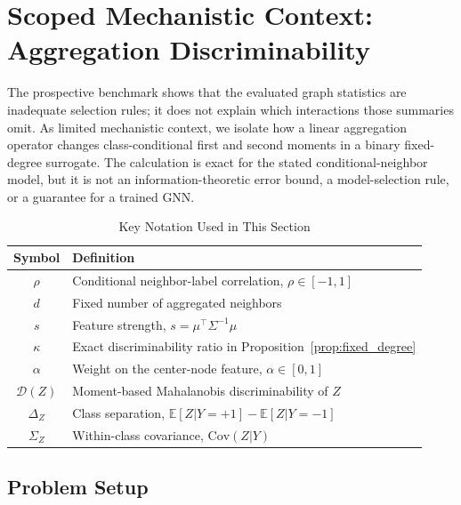 
\section{Scoped Mechanistic Context: Aggregation Discriminability}
\label{sec:snr}

The prospective benchmark shows that the evaluated graph statistics are inadequate selection rules; it does not explain which interactions those summaries omit. As limited mechanistic context, we isolate how a linear aggregation operator changes class-conditional first and second moments in a binary fixed-degree surrogate. The calculation is exact for the stated conditional-neighbor model, but it is not an information-theoretic error bound, a model-selection rule, or a guarantee for a trained GNN.

\begin{table}[t]
\centering
\caption{Key Notation Used in This Section}
\label{tab:notation}
\small
\begin{tabular}{@{}cl@{}}
\toprule
\textbf{Symbol} & \textbf{Definition} \\
\midrule
$\rho$ & Conditional neighbor-label correlation, $\rho\in[-1,1]$ \\
$d$ & Fixed number of aggregated neighbors \\
$s$ & Feature strength, $s=\mu^\top\Sigma^{-1}\mu$ \\
$\kappa$ & Exact discriminability ratio in Proposition~\ref{prop:fixed_degree} \\
$\alpha$ & Weight on the center-node feature, $\alpha\in[0,1]$ \\
$\mathcal{D}(Z)$ & Moment-based Mahalanobis discriminability of $Z$ \\
$\Delta_Z$ & Class separation, $\mathbb{E}[Z|Y=+1] - \mathbb{E}[Z|Y=-1]$ \\
$\Sigma_Z$ & Within-class covariance, $\mathrm{Cov}(Z|Y)$ \\
\bottomrule
\end{tabular}
\end{table}

\subsection{Problem Setup}

